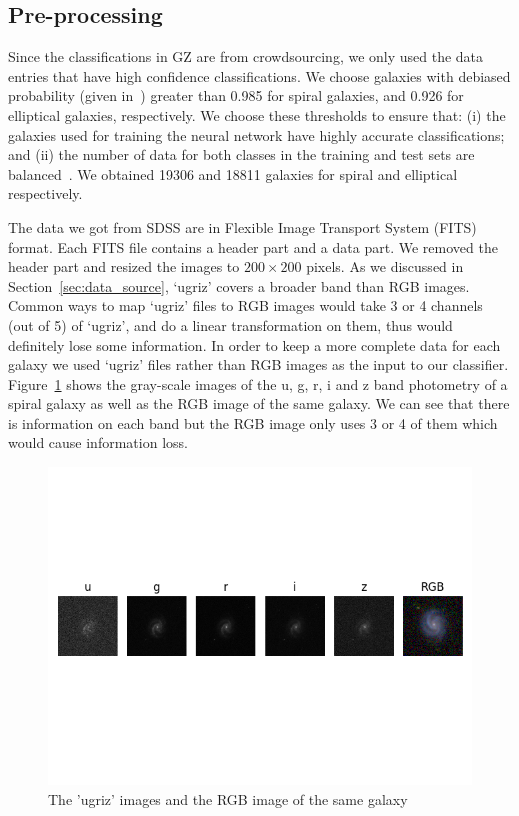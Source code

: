 \subsection{Pre-processing}
Since the classifications in GZ are from crowdsourcing, we only used the data entries that
have high confidence classifications. We choose galaxies with debiased probability (given in~\cite{lintott2010galaxy}) greater than 0.985 for spiral galaxies, and 0.926 for elliptical galaxies, respectively. 
We choose these thresholds to ensure that: (i) the galaxies used for training the neural network have highly accurate classifications; and (ii) the number of data for both classes in the training and test sets are balanced~\cite{khan2019deep}. We obtained 19306 and 18811 galaxies for spiral and elliptical respectively. 

The data we got from SDSS are in Flexible Image Transport System (FITS) format. 
Each FITS file contains a header part and a data part. We removed the header part and resized the images to $200 \times 200$ pixels. As we discussed in Section~\ref{sec:data_source}, `ugriz' covers a broader band than RGB images. Common ways to map `ugriz' files to RGB images would take 3 or 4 channels (out of 5) of `ugriz', and do a linear transformation on them, thus would definitely lose some information. 
In order to keep a more complete data for each galaxy we used `ugriz' files rather than RGB images as the input to our classifier. Figure~\ref{fig:ugriz} shows the gray-scale images of the u, g, r, i and z band photometry of a spiral galaxy as well as the RGB image of the same galaxy. We can see that there is information on each band but the RGB image only uses 3 or 4 of them which would cause information loss.

\begin{figure}[h]
	\centering
	\captionsetup{justification=centering}
	\includegraphics[trim={0 4cm 0 4cm},clip]{Figures/ugriz_vs_rgb.png}
	\caption{The 'ugriz' images and the RGB image of the same galaxy}
	\label{fig:ugriz}
\end{figure}

